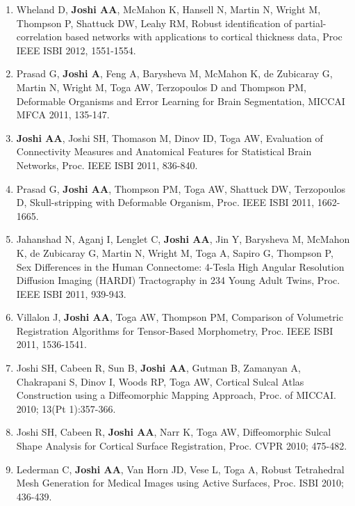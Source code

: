 \documentclass[overlapped,line,letterpaper]{res}
\begin{document}
\begin{resume}
\begin{enumerate}
    \item Wheland D, \textbf{Joshi AA}, McMahon K, Hansell N, Martin N, Wright M, Thompson P, Shattuck DW, Leahy RM, {Robust identification of partial-correlation based networks with applications to cortical thickness data}, Proc IEEE ISBI 2012, 1551-1554.

    \item Prasad  G, \textbf{Joshi A}, Feng A, Barysheva M, McMahon K, de Zubicaray G, Martin N, Wright M, Toga AW, Terzopoulos D and Thompson PM, {Deformable Organisms and Error Learning for Brain Segmentation}, MICCAI MFCA 2011, 135-147.

    \item \textbf{Joshi AA}, Joshi SH, Thomason M, Dinov ID, Toga AW, {Evaluation of Connectivity Measures and Anatomical Features for Statistical Brain Networks}, Proc. IEEE ISBI 2011, 836-840. 

    \item Prasad G, \textbf{Joshi AA}, Thompson PM, Toga AW, Shattuck DW, Terzopoulos D, {Skull-stripping with Deformable Organism}, Proc. IEEE ISBI 2011, 1662-1665. 

    \item Jahanshad N, Aganj I, Lenglet C, \textbf{Joshi AA}, Jin Y, Barysheva M, McMahon K, de Zubicaray G, Martin N, Wright M, Toga A, Sapiro G, Thompson P, {Sex Differences in the Human Connectome: 4-Tesla High Angular Resolution Diffusion Imaging (HARDI) Tractography in 234 Young Adult Twins}, Proc. IEEE ISBI 2011, 939-943.

    \item Villalon J, \textbf{Joshi AA}, Toga AW, Thompson PM, {Comparison of Volumetric Registration Algorithms for Tensor-Based Morphometry}, Proc. IEEE ISBI 2011, 1536-1541. 

    \item Joshi SH, Cabeen R, Sun B, \textbf{Joshi AA}, Gutman B, Zamanyan A, Chakrapani S, Dinov I, Woods RP, Toga AW, {Cortical Sulcal Atlas Construction using a Diffeomorphic Mapping Approach}, Proc. of MICCAI. 2010; 13(Pt 1):357-366.

    \item Joshi SH, Cabeen R, \textbf{Joshi AA}, Narr K, Toga AW, {Diffeomorphic Sulcal Shape Analysis for Cortical Surface Registration}, Proc. CVPR 2010; 475-482.

    \item Lederman C, \textbf{Joshi AA}, Van Horn JD, Vese L, Toga A, {Robust Tetrahedral Mesh Generation for Medical Images using Active Surfaces}, Proc. ISBI 2010; 436-439.


\end{enumerate}
\end{resume}
\end{document}
